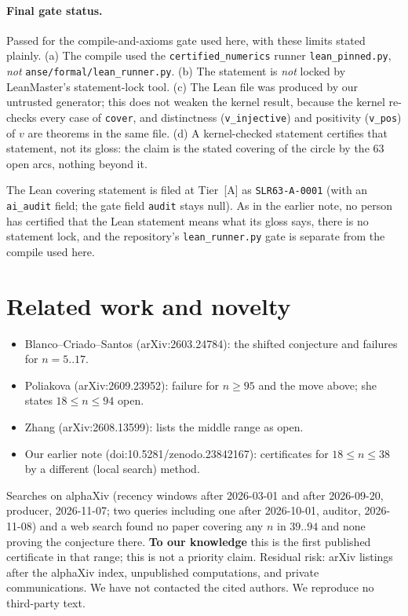 \documentclass[10pt]{article}
\newcommand{\tier}[1]{\textsf{[#1]}}
\newcommand{\tA}{\tier{A}}
\newcommand{\lean}[1]{\texttt{#1}}
\begin{document}
\paragraph{Final gate status.} Passed for the compile-and-axioms gate used here, with these limits stated plainly. (a) The compile used the \texttt{certified\_numerics} runner \texttt{lean\_pinned.py}, \emph{not} \texttt{anse/formal/lean\_runner.py}. (b) The statement is \emph{not} locked by LeanMaster's statement-lock tool. (c) The Lean file was produced by our untrusted generator; this does not weaken the kernel result, because the kernel re-checks every case of \lean{cover}, and distinctness (\lean{v\_injective}) and positivity (\lean{v\_pos}) of $v$ are theorems in the same file. (d) A kernel-checked statement certifies that statement, not its gloss: the claim is the stated covering of the circle by the $63$ open arcs, nothing beyond it.

\medskip\noindent The Lean covering statement is filed at Tier~\tA{} as \texttt{SLR63-A-0001} (with an \texttt{ai\_audit} field; the gate field \texttt{audit} stays null). As in the earlier note, no person has certified that the Lean statement means what its gloss says, there is no statement lock, and the repository's \texttt{lean\_runner.py} gate is separate from the compile used here.

\section{Related work and novelty}\label{sec:scoop}
\begin{itemize}\itemsep=0pt
\item Blanco--Criado--Santos \cite{bcs} (arXiv:2603.24784): the shifted conjecture and failures for $n=5..17$.
\item Poliakova \cite{pol} (arXiv:2609.23952): failure for $n\ge95$ and the move above; she states $18\le n\le94$ open.
\item Zhang \cite{zhang} (arXiv:2608.13599): lists the middle range as open.
\item Our earlier note \cite{slr18} (doi:10.5281/zenodo.23842167): certificates for $18\le n\le38$ by a different (local search) method.
\end{itemize}
Searches on alphaXiv (recency windows after 2026-03-01 and after 2026-09-20, producer, 2026-11-07; two queries including one after 2026-10-01, auditor, 2026-11-08) and a web search found no paper covering any $n$ in $39..94$ and none proving the conjecture there. \textbf{To our knowledge} this is the first published certificate in that range; this is not a priority claim. Residual risk: arXiv listings after the alphaXiv index, unpublished computations, and private communications. We have not contacted the cited authors. We reproduce no third-party text.
\end{document}
